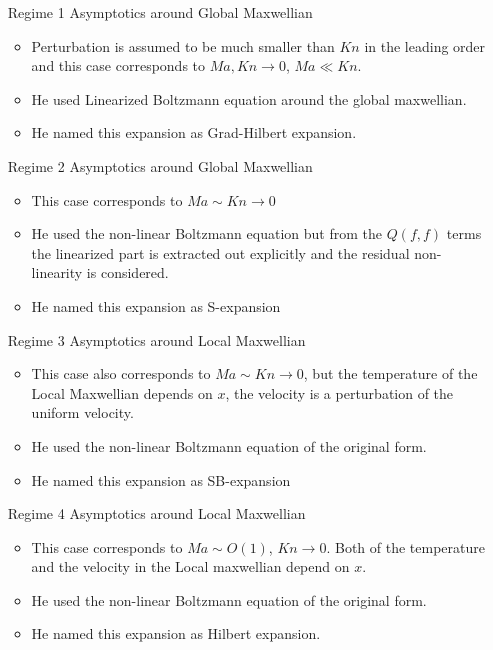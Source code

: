 \documentclass[a4paper,12pt]{article}
\begin{document}
\begin{enumerate}
 \item[Regime 1] Asymptotics around Global Maxwellian 
 \begin{itemize}
  \item Perturbation is assumed to be much smaller than $Kn$ in the leading order and this case corresponds to $Ma, Kn \rightarrow 0$, $Ma \ll Kn$.
  \item He used Linearized Boltzmann equation around the global maxwellian.
  \item He named this expansion as Grad-Hilbert expansion.
 \end{itemize}
 
  \item[Regime 2] Asymptotics around Global Maxwellian
 \begin{itemize}
  \item This case corresponds to $Ma \sim Kn \rightarrow 0$
  \item He used the non-linear Boltzmann equation but from the $Q(f,f)$ terms the linearized part is extracted out explicitly and the residual non-linearity is considered.
  \item He named this expansion as S-expansion
 \end{itemize}
 
  \item[Regime 3] Asymptotics around Local Maxwellian 
 \begin{itemize}
  \item This case also corresponds to $Ma \sim Kn \rightarrow 0$, but the temperature of the Local Maxwellian depends on $x$, the velocity is a perturbation of the uniform velocity.
  \item He used the non-linear Boltzmann equation of the original form.
  \item He named this expansion as SB-expansion
 \end{itemize}
 
  \item[Regime 4] Asymptotics around Local Maxwellian 
 \begin{itemize}
  \item This case corresponds to $Ma \sim O(1)$, $Kn \rightarrow 0$. Both of the temperature and the velocity in the Local maxwellian depend on $x$.
  \item He used the non-linear Boltzmann equation of the original form.
  \item He named this expansion as Hilbert expansion.
 \end{itemize} 

\end{enumerate}
\end{document}
